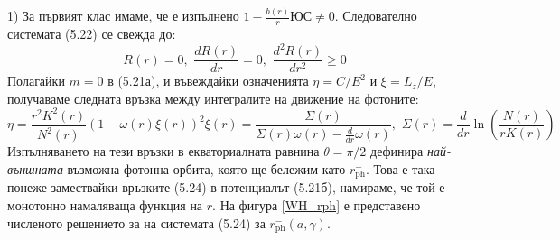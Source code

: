 	1) За първият клас имаме, че е изпълнено $1 - \frac{b(r)}{r}ЮС \ne 0$. Следователно системата (5.22) се свежда до:
	\begin{equation}
		R(r) = 0,\,\, \frac{dR(r)}{dr} = 0,\,\, \frac{d^2R(r)}{dr^2} \ge 0
	\end{equation}
	Полагайки $m = 0$ в (5.21а), и въвеждайки означенията $\eta = C / E^2$ и $\xi = L_z / E$, получаваме следната връзка между интегралите на движение на фотоните:
	\begin{subequations}
		\begin{equation}
			\eta = \frac{r^2K^2(r)}{N^2(r)}\left(1 - \omega(r)\xi(r)\right)^2
		\end{equation}
		\begin{equation}
			\xi(r) = \frac{\Sigma(r)}{\Sigma(r)\omega(r) - \frac{d}{dr}\omega(r)},\,\, \Sigma(r) = \frac{d}{dr}\ln\left(\frac{N(r)}{rK(r)}\right)
		\end{equation}
	\end{subequations}
	Изпълняването на тези връзки в екваториалната равнина $\theta = \pi / 2$ дефинира \emph{най-външната} възможна фотонна орбита, която ще бележим като $r_{\text{ph}}^-$. Това е така понеже замествайки връзките (5.24) в потенциалът (5.21б), намираме, че той е монотонно намаляваща функция на $r$. На фигура \ref{WH_rph} е представено численото решението за на системата (5.24) за $r^-_{\text{ph}}(a,\gamma)$. \\
